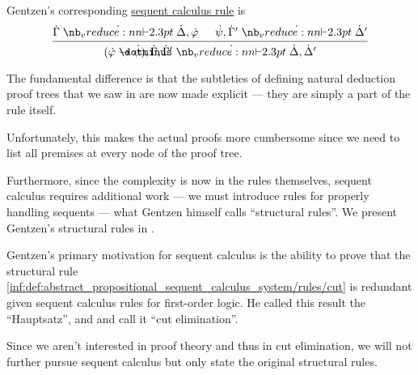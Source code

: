 \begin{remark}
  Gentzen's corresponding \hyperref[def:abstract_propositional_sequent_calculus_system]{sequent calculus rule} is
  \begin{equation*}
    \begin{prooftree}
      \hypo{ \syn\Gamma \synvdash \syn\Delta, \syn\varphi }
      \hypo{ \syn\psi, \syn\Gamma' \synvdash \syn\Delta' }
      \infer2{ (\syn\varphi \synimplies \syn\psi), \syn\Gamma, \syn\Gamma' \synvdash \syn\Delta, \syn\Delta' }
    \end{prooftree}
  \end{equation*}

  The fundamental difference is that the subtleties of defining natural deduction proof trees that we saw in  are now made explicit --- they are simply a part of the rule itself.

  Unfortunately, this makes the actual proofs more cumbersome since we need to list all premises at every node of the proof tree.

  Furthermore, since the complexity is now in the rules themselves, sequent calculus requires additional work --- we must introduce rules for properly handling sequents --- what Gentzen himself calls \enquote{structural rules}. We present Gentzen's structural rules in .

  Gentzen's primary motivation for sequent calculus is the ability to prove that the structural rule \ref{inf:def:abstract_propositional_sequent_calculus_system/rules/cut} is redundant given sequent calculus rules for first-order logic. He called this result the \enquote{Hauptsatz}, and  and  call it \enquote{cut elimination}.

  Since we aren't interested in proof theory and thus in cut elimination, we will not further pursue sequent calculus but only state the original structural rules.
\end{remark}


